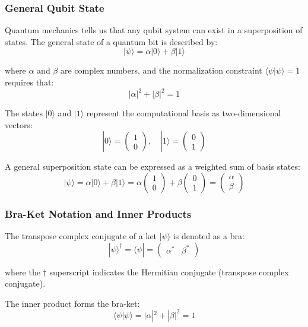 \documentclass{article}
\begin{document}
\subsubsection*{General Qubit State}

Quantum mechanics tells us that any qubit system can exist in a superposition of states. The general state of a quantum bit is described by:
$$|\psi\rangle = \alpha|0\rangle + \beta|1\rangle$$

where $\alpha$ and $\beta$ are complex numbers, and the normalization constraint $\langle\psi|\psi\rangle = 1$ requires that:
$$|\alpha|^2 + |\beta|^2 = 1$$

The states $|0\rangle$ and $|1\rangle$ represent the computational basis as two-dimensional vectors:
$$|0\rangle = \begin{pmatrix} 1 \\ 0 \end{pmatrix}, \quad |1\rangle = \begin{pmatrix} 0 \\ 1 \end{pmatrix}$$

A general superposition state can be expressed as a weighted sum of basis states:
$$|\psi\rangle = \alpha|0\rangle + \beta|1\rangle = \alpha\begin{pmatrix} 1 \\ 0 \end{pmatrix} + \beta\begin{pmatrix} 0 \\ 1 \end{pmatrix} = \begin{pmatrix} \alpha \\ \beta \end{pmatrix}$$

\subsubsection*{Bra-Ket Notation and Inner Products}

The transpose complex conjugate of a ket $|\psi\rangle$ is denoted as a bra:
$$|\psi\rangle^\dagger = \langle\psi| = \begin{pmatrix} \alpha^* & \beta^* \end{pmatrix}$$

where the $\dagger$ superscript indicates the Hermitian conjugate (transpose complex conjugate).

The inner product forms the bra-ket:
$$\langle\psi|\psi\rangle = |\alpha|^2 + |\beta|^2 = 1$$
\end{document}

